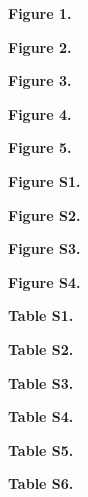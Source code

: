 \documentclass[letterpaper]{article}
\newcommand*{\commonDir}{./common/}    %
\begin{document}

\noindent\textbf{Figure 1.} 
\eeFBAfigOneCap

\hspace{1ex}

\noindent\textbf{Figure 2.} 
\eeFBAfigTwoCap

\hspace{1ex}

\noindent\textbf{Figure 3.} 
\eeFBAfigThreeCap

\hspace{1ex}

\noindent\textbf{Figure 4.}
\eeFBAfigFourCap

\hspace{1ex}

\noindent\textbf{Figure 5.}
\eeFBAfigFiveCap

\hspace{1ex}

\noindent\textbf{Figure S1.} 
\eeFBAfigSOneCap

\hspace{1ex}

\noindent\textbf{Figure S2.} 
\eeFBAfigSTwoCap

\hspace{1ex}

\noindent\textbf{Figure S3.} 
\eeFBAfigSThreeCap

\hspace{1ex}

\noindent\textbf{Figure S4.}
\eeFBAfigSFourCap

\hspace{1ex}

\noindent\textbf{Table S1.} 
\eeFBATabSOneCap

\hspace{1ex}

\noindent\textbf{Table S2.} 
\eeFBATabSTwoCap

\hspace{1ex}

\noindent\textbf{Table S3.} 
\eeFBATabSThreeCap

\hspace{1ex}

\noindent\textbf{Table S4.}
\eeFBATabSFourCap

\hspace{1ex}

\noindent\textbf{Table S5.}
\eeFBATabSFiveCap

\hspace{1ex}

\noindent\textbf{Table S6.}
\eeFBATabSSixCap

\hspace{1ex}






\end{document}
